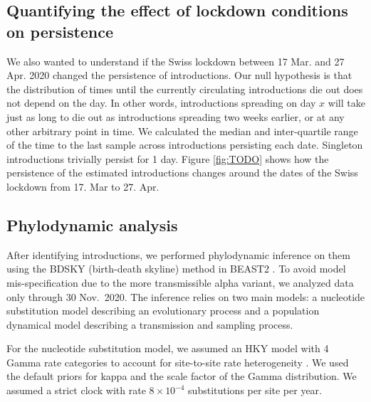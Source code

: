 \documentclass[11pt,twoside,lineno]{pnas-new} %
\begin{document}
\subsection{Quantifying the effect of lockdown conditions on persistence}
We also wanted to understand if the Swiss lockdown between 17 Mar. and 27 Apr. 2020 changed the persistence of introductions. Our null hypothesis is that the distribution of times until the currently circulating introductions die out does not depend on the day. In other words, introductions spreading on day $x$ will take just as long to die out as introductions spreading two weeks earlier, or at any other arbitrary point in time. We calculated the median and inter-quartile range of the time to the last sample across introductions persisting each date. Singleton introductions trivially persist for 1 day. Figure \ref{fig:TODO} shows how the persistence of the estimated introductions changes around the dates of the Swiss lockdown from 17. Mar to 27. Apr.

\subsection*{Phylodynamic analysis}

After identifying introductions, we performed phylodynamic inference on them using the BDSKY (birth-death skyline) method \cite{stadler2013birth} in BEAST2 \cite{Bouckaert2019}. To avoid model mis-specification due to the more transmissible alpha variant, we analyzed data only through 30 Nov.~2020.  The inference relies on two main models: a nucleotide substitution model describing an evolutionary process and a population dynamical model describing a transmission and sampling process. 

For the nucleotide substitution model, we assumed an HKY \cite{Hasegawa1985} model with 4 Gamma rate categories to account for site-to-site rate heterogeneity \cite{Yang1994}. We used the default priors for kappa and the scale factor of the Gamma distribution. We assumed a strict clock with rate $8\times 10^{-4}$ substitutions per site per year.
\end{document}
